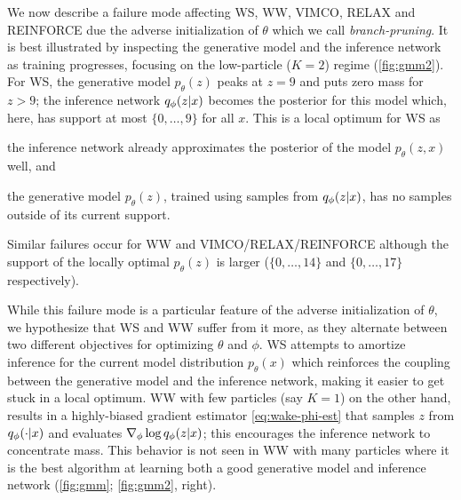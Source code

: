 We now describe a failure mode affecting \gls{WS}, \gls{WW}, \gls{VIMCO}, \acrshort{RELAX} and \acrshort{REINFORCE} due the adverse initialization of $\theta$ which we call \emph{branch-pruning}.
%
It is best illustrated by inspecting the generative model and the inference network as training progresses, focusing on the low-particle ($K = 2$) regime (\cref{fig:gmm2}).
%
For \gls{WS}, the generative model $p_\theta(z)$ peaks at $z = 9$ and puts zero mass for $z > 9$; the inference network $q_\phi(z \lvert x)$ becomes the posterior for this model which, here, has support at most $\{0, \dotsc, 9\}$ for all $x$.
This is a local optimum for \gls{WS} as
%
\begin{inparaenum}[(i)]
\item the inference network already approximates the posterior of the model $p_\theta(z, x)$ well, and
\item the generative model $p_\theta(z)$, trained using samples from $q_\phi(z \lvert x)$, has no samples outside of its current support. %
\end{inparaenum}
%
Similar failures occur for \gls{WW} and \gls{VIMCO}/\acrshort{RELAX}/\acrshort{REINFORCE} although the support of the locally optimal $p_\theta(z)$ is larger ($\{0, \dotsc, 14\}$ and $\{0, \dotsc, 17\}$ respectively).

While this failure mode is a particular feature of the adverse initialization of $\theta$, we hypothesize that \gls{WS} and \gls{WW} suffer from it more, as they alternate between two different objectives for optimizing $\theta$ and $\phi$.
\Gls{WS} attempts to amortize inference for the current model distribution $p_\theta(x)$ which reinforces the coupling between the generative model and the inference network, making it easier to get stuck in a local optimum.
\Gls{WW} with few particles (say $K = 1$) on the other hand, results in a highly-biased gradient estimator \cref{eq:wake-phi-est} that samples $z$ from $q_\phi(\cdot \lvert x)$ and evaluates $\nabla_\phi \log q_\phi(z \lvert x)$; this encourages the inference network to concentrate mass.
This behavior is not seen in \gls{WW} with many particles where it is the best algorithm at learning both a good generative model and inference network (\cref{fig:gmm}; \cref{fig:gmm2}, right).



